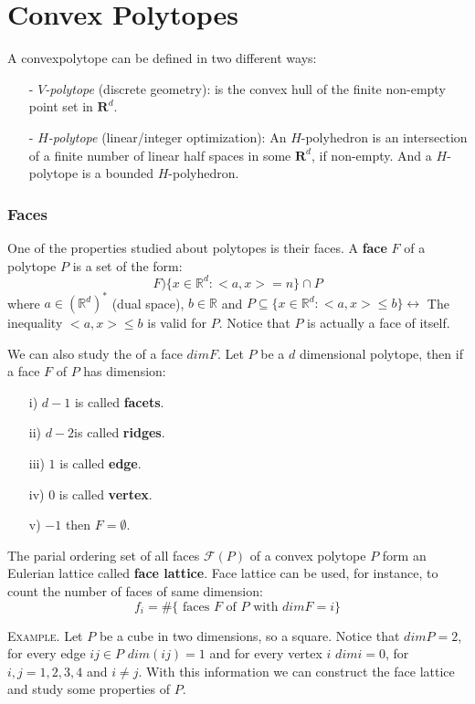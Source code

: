 \chapter{Convex Polytopes}

 
A convexpolytope can be defined in two different ways:
\begin{enumerate}
\item[-] \textit{$V$-polytope} (discrete geometry): is the convex hull of the finite non-empty point set in $\mathbf{R}^d$.
\item[-]\textit{$H$-polytope} (linear/integer optimization): An $H$-polyhedron is an intersection of a finite number of linear half spaces in some $\mathbf{R}^d$, if non-empty. And a $H$-polytope is a bounded $H$-polyhedron. 
\end{enumerate}
\bigskip
\subsection{Faces}
One of the properties studied about polytopes is their faces. A \textbf{face} $F$ of a polytope $P$ is a set of the form:
\[F ) \{x\in \mathbb{R}^d: <a,x> = n\}\cap P\]
where $a\in (\mathbb{R}^d)^*$ (dual space), $b\in\mathbb{R}$ and $P\subseteq\{x\in\mathbb{R}^d: <a,x> \leq b \}\longleftrightarrow$ The inequality $<a,x> \leq b$ is valid for $P$. Notice that $P$ is actually a face of itself. 

We can also study the of a face $dim F$. Let $P$ be a $d$ dimensional polytope, then if a face $F$ of $P$ has dimension:
\begin{itemize}
\item[i)] $d -1$ is called \textbf{facets}.
\item[ii)] $d -2$is called \textbf{ridges}.
\item[iii)] $1$ is called \textbf{edge}.
\item[iv)] $0$ is called \textbf{vertex}.
\item[v)] $ -1$ then $F=\emptyset$.
\end{itemize}

The parial ordering set of all faces  $\mathcal{F}(P)$ of a convex polytope $P$ form an Eulerian lattice called \textbf{face lattice}. Face lattice can be used, for instance, to count the number of faces of same dimension:
\[f_i = \# \{ \mbox{ faces } F \mbox{ of } P \mbox{ with } dimF=i\} \label{eq1}\]

\bigskip

\textsc{Example}. Let $P$ be a cube in two dimensions, so a square. Notice that $dim P = 2$, for every edge $ij\in P$ $dim(ij) = 1$ and for every vertex $i$ $dim i= 0$, for $i,j= 1, 2 , 3,4$ and $i\neq j$. With this information we can construct the face lattice and study some properties of $P$.

